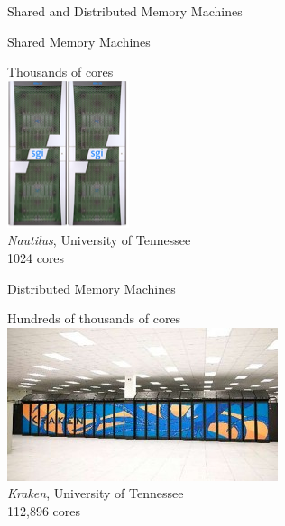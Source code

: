 \begin{frame}
  \begin{block}{Shared and Distributed Memory Machines}
   \begin{center}
    \begin{minipage}[t]{.47\textwidth}
    \begin{block}{Shared Memory Machines}
    \begin{center}
    Thousands of cores\\[.2cm]
    \includegraphics[scale=.65]{pics/nautilus}\\
    {\tiny \emph{Nautilus}, University of Tennessee\\1024 cores}
    \end{center}
    \end{block}
    \end{minipage}
    \hspace{.1cm}
    \begin{minipage}[t]{.47\textwidth}
    \begin{block}{Distributed Memory Machines}
    \begin{center}
    Hundreds of thousands of cores\\[.2cm]
    \includegraphics[width=.95\textwidth]{pics/kraken}\\
    {\tiny \emph{Kraken}, University of Tennessee\\ 112,896 cores}
    \end{center}
    \end{block}
    \end{minipage}
    \end{center}
    \end{block}
\end{frame}





